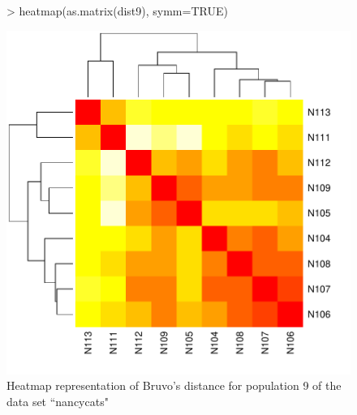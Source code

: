 \documentclass[letterpaper]{article}
\begin{document}
\begin{figure}[h!]
  \centering
  \caption{\footnotesize Heatmap representation of Bruvo's distance for population 9 of the data set ``nancycats"}
  \label{bruvo_heat_map}
\begin{Schunk}
\begin{Sinput}
> heatmap(as.matrix(dist9), symm=TRUE)
\end{Sinput}
\end{Schunk}
\includegraphics{poppr_manual-112}
\end{figure}
\end{document}
